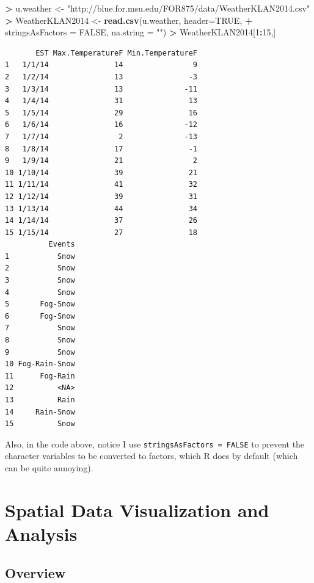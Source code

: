 \documentclass[]{krantz}
\makeatletter
\newenvironment{Shaded}{\begin{snugshade}}{\end{snugshade}}
\newcommand{\DataTypeTok}[1]{\textcolor[rgb]{0.27,0.27,0.27}{#1}}
\newcommand{\DecValTok}[1]{\textcolor[rgb]{0.06,0.06,0.06}{#1}}
\newcommand{\KeywordTok}[1]{\textcolor[rgb]{0.27,0.27,0.27}{\textbf{#1}}}
\newcommand{\NormalTok}[1]{#1}
\newcommand{\OperatorTok}[1]{\textcolor[rgb]{0.43,0.43,0.43}{\textbf{#1}}}
\newcommand{\OtherTok}[1]{\textcolor[rgb]{0.37,0.37,0.37}{#1}}
\newcommand{\StringTok}[1]{\textcolor[rgb]{0.5,0.5,0.5}{#1}}
\newenvironment{kframe}{%
\medskip{}
\setlength{\fboxsep}{.8em}
 \def\at@end@of@kframe{}%
 \ifinner\ifhmode%
  \def\at@end@of@kframe{\end{minipage}}%
  \begin{minipage}{\columnwidth}%
 \fi\fi%
 \def\FrameCommand##1{\hskip\@totalleftmargin \hskip-\fboxsep
 \colorbox{shadecolor}{##1}\hskip-\fboxsep
     \hskip-\linewidth \hskip-\@totalleftmargin \hskip\columnwidth}%
 \MakeFramed {\advance\hsize-\width
   \@totalleftmargin\z@ \linewidth\hsize
   \@setminipage}}%
 {\par\unskip\endMakeFramed%
 \at@end@of@kframe}
\renewenvironment{Shaded}{\begin{kframe}}{\end{kframe}}
\makeatother
\begin{document}
\begin{Shaded}
\begin{Highlighting}[]
\OperatorTok{>}\StringTok{ }\NormalTok{u.weather <-}\StringTok{ "http://blue.for.msu.edu/FOR875/data/WeatherKLAN2014.csv"}
\OperatorTok{>}\StringTok{ }\NormalTok{WeatherKLAN2014 <-}\StringTok{ }\KeywordTok{read.csv}\NormalTok{(u.weather, }\DataTypeTok{header=}\OtherTok{TRUE}\NormalTok{, }
\OperatorTok{+}\StringTok{                             }\DataTypeTok{stringsAsFactors =} \OtherTok{FALSE}\NormalTok{, }\DataTypeTok{na.string =} \StringTok{""}\NormalTok{)}
\OperatorTok{>}\StringTok{ }\NormalTok{WeatherKLAN2014[}\DecValTok{1}\OperatorTok{:}\DecValTok{15}\NormalTok{,]}
\end{Highlighting}
\end{Shaded}

\begin{verbatim}
       EST Max.TemperatureF Min.TemperatureF
1   1/1/14               14                9
2   1/2/14               13               -3
3   1/3/14               13              -11
4   1/4/14               31               13
5   1/5/14               29               16
6   1/6/14               16              -12
7   1/7/14                2              -13
8   1/8/14               17               -1
9   1/9/14               21                2
10 1/10/14               39               21
11 1/11/14               41               32
12 1/12/14               39               31
13 1/13/14               44               34
14 1/14/14               37               26
15 1/15/14               27               18
          Events
1           Snow
2           Snow
3           Snow
4           Snow
5       Fog-Snow
6       Fog-Snow
7           Snow
8           Snow
9           Snow
10 Fog-Rain-Snow
11      Fog-Rain
12          <NA>
13          Rain
14     Rain-Snow
15          Snow
\end{verbatim}

Also, in the code above, notice I use \texttt{stringsAsFactors\ =\ FALSE} to prevent the character variables to be converted to factors, which R does by default (which can be quite annoying).

\hypertarget{spatial-data-visualization-and-analysis}{%
\chapter{Spatial Data Visualization and Analysis}\label{spatial-data-visualization-and-analysis}}

\hypertarget{overview}{%
\section{Overview}\label{overview}}
\end{document}
